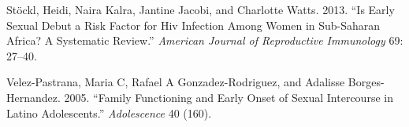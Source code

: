 \documentclass[
]{article}
\newlength{\cslhangindent}
\newenvironment{cslreferences}%
  {\setlength{\parindent}{0pt}%
  \everypar{\setlength{\hangindent}{\cslhangindent}}\ignorespaces}%
  {\par}
\begin{document}
\begin{cslreferences}
\leavevmode\hypertarget{ref-stockl2013early}{}%
Stöckl, Heidi, Naira Kalra, Jantine Jacobi, and Charlotte Watts. 2013.
``Is Early Sexual Debut a Risk Factor for Hiv Infection Among Women in
Sub-Saharan Africa? A Systematic Review.'' \emph{American Journal of
Reproductive Immunology} 69: 27--40.

\leavevmode\hypertarget{ref-velez2005family}{}%
Velez-Pastrana, Maria C, Rafael A Gonzadez-Rodriguez, and Adalisse
Borges-Hernandez. 2005. ``Family Functioning and Early Onset of Sexual
Intercourse in Latino Adolescents.'' \emph{Adolescence} 40 (160).
\end{cslreferences}
\end{document}
